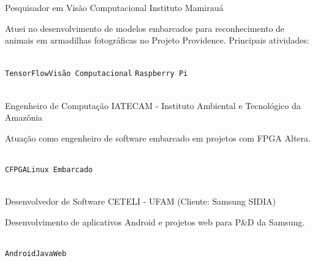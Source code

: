 \documentclass[10pt]{developercv}
\begin{document}
\begin{entrylist}
  {Pesquisador em Visão Computacional}
  {Instituto Mamirauá}
  {
    Atuei no desenvolvimento de modelos embarcados para reconhecimento de
animais em armadilhas fotográficas no Projeto Providence. Principais
atividades:\\
    \begin{contributionlist}
    \end{contributionlist}\\
\texttt{TensorFlow}\slashsep\texttt{Visão Computacional}
\slashsep\texttt {Raspberry Pi}}\\


  {Engenheiro de Computação}
  {IATECAM - Instituto Ambiental e Tecnológico da Amazônia}
  {
  Atuação como engenheiro de software embarcado em projetos com FPGA Altera.
    \begin{contributionlist}
    \end{contributionlist}\\
\texttt{C}\slashsep\texttt{FPGA}\slashsep\texttt{Linux Embarcado}}
\\

  {Desenvolvedor de Software}
  {CETELI - UFAM (Cliente: Samsung SIDIA)}
  {
  Desenvolvimento de aplicativos Android e projetos web para P\&D da Samsung.
    \begin{contributionlist}
    \end{contributionlist}\\
\texttt{Android}\slashsep\texttt{Java}\slashsep\texttt{Web}} \\


\end{entrylist}
\end{document}
